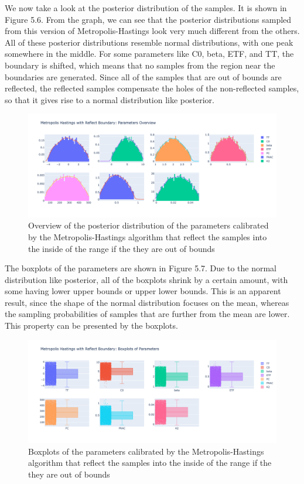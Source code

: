We now take a look at the posterior distribution of the samples. It is shown in Figure 5.6. From the graph, we can see that the posterior distributions sampled from this version of Metropolis-Hastings look very much different from the others. All of these posterior distributions resemble normal distributions, with one peak somewhere in the middle. For some parameters like C0, beta, ETF, and TT, the boundary is shifted, which means that no samples from the region near the boundaries are generated. Since all of the samples that are out of bounds are reflected, the reflected samples compensate the holes of the non-reflected samples, so that it gives rise to a normal distribution like posterior.

\begin{figure}[H]
    \centering
    \includegraphics[width=1\textwidth]{figures/basic_mh/rb_mh/rb_mh_parameters_overview.png}
    \captionsetup{width=.8\textwidth}
    \caption{Overview of the posterior distribution of the parameters calibrated by the Metropolis-Hastings algorithm that reflect the samples into the inside of the range if the they are out of bounds}
    \label{fig:enter-label}
\end{figure}

The boxplots of the parameters are shown in Figure 5.7. Due to the normal distribution like posterior, all of the boxplots shrink by a certain amount, with some having lower upper bounds or upper lower bounds. This is an apparent result, since the shape of the normal distribution focuses on the mean, whereas the sampling probabilities of samples that are further from the mean are lower. This property can be presented by the boxplots.

\begin{figure}[H]
    \centering
    \includegraphics[width=1\textwidth]{figures/basic_mh/rb_mh/rb_mh_boxplot.png}
    \captionsetup{width=.8\textwidth}
    \caption{Boxplots of the parameters calibrated by the Metropolis-Hastings algorithm that reflect the samples into the inside of the range if the they are out of bounds}
    \label{fig:enter-label}
\end{figure}



